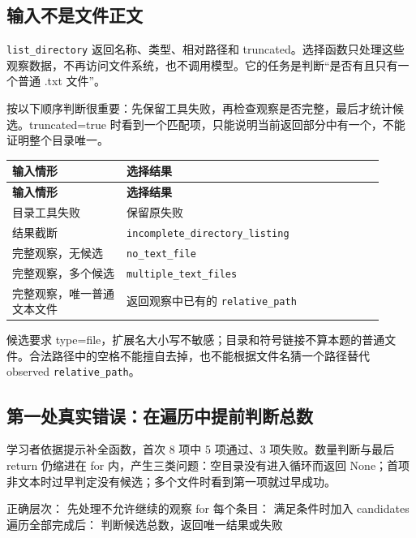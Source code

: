 \subsection{输入不是文件正文}

\nolinkurl{list_directory} 返回名称、类型、相对路径和 truncated。选择函数只处理这些观察数据，不再访问文件系统，也不调用模型。它的任务是判断“是否有且只有一个普通 .txt 文件”。

按以下顺序判断很重要：先保留工具失败，再检查观察是否完整，最后才统计候选。truncated=true 时看到一个匹配项，只能说明当前返回部分中有一个，不能证明整个目录唯一。

{\small\setlength{\tabcolsep}{4pt}
\renewcommand{\arraystretch}{1.25}
\begin{longtable}{>{\raggedright\arraybackslash}p{0.28\linewidth}>{\raggedright\arraybackslash}p{0.63\linewidth}}
\toprule
\textbf{输入情形} & \textbf{选择结果} \\
\midrule\endfirsthead
\toprule
\textbf{输入情形} & \textbf{选择结果} \\
\midrule\endhead
\bottomrule\endfoot
目录工具失败 & 保留原失败 \\
结果截断 & \nolinkurl{incomplete_directory_listing} \\
完整观察，无候选 & \nolinkurl{no_text_file} \\
完整观察，多个候选 & \nolinkurl{multiple_text_files} \\
完整观察，唯一普通文本文件 & 返回观察中已有的 \nolinkurl{relative_path} \\
\end{longtable}}

候选要求 type=file，扩展名大小写不敏感；目录和符号链接不算本题的普通文件。合法路径中的空格不能擅自去掉，也不能根据文件名猜一个路径替代 observed \nolinkurl{relative_path}。

\subsection{第一处真实错误：在遍历中提前判断总数}

学习者依据提示补全函数，首次 8 项中 5 项通过、3 项失败。数量判断与最后 return 仍缩进在 for 内，产生三类问题：空目录没有进入循环而返回 None；首项非文本时过早判定没有候选；多个文件时看到第一项就过早成功。

\begin{Code}
正确层次：
先处理不允许继续的观察
for 每个条目：
    满足条件时加入 candidates
遍历全部完成后：
    判断候选总数，返回唯一结果或失败
\end{Code}

